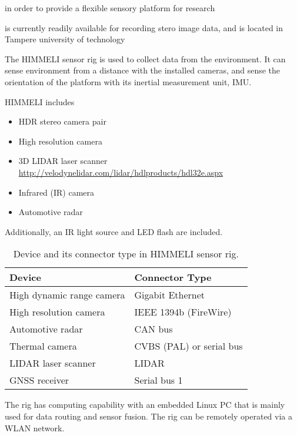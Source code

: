 \documentclass[12pt,a4paper,oneside,pdftex]{report}
\begin{document}
in order to provide a flexible sensory platform for research 

is currently readily available for recording stero image data, and is located in Tampere university of technology 



The HIMMELI sensor rig is used to collect data from the environment. It can sense environment from a distance with the installed cameras, and sense the orientation of the platform with its inertial measurement unit, IMU.

HIMMELI includes

\begin{itemize}
\setlength{\itemsep}{0pt}
\item HDR stereo camera pair
\item High resolution camera
\item 3D LIDAR laser scanner \url{http://velodynelidar.com/lidar/hdlproducts/hdl32e.aspx}
\item Infrared (IR) camera
\item Automotive radar
\end{itemize}

Additionally, an IR light source and LED flash are included.

\begin{table}
\caption{Device and its connector type in HIMMELI sensor rig.}
\label{table:connectortypes} %
\begin{tabular}{|p{6cm}|p{5cm}|}
\hline %
\textbf{Device} & \textbf{Connector Type} \\
\hline
High dynamic range camera & Gigabit Ethernet \\
\hline
High resolution camera & IEEE 1394b (FireWire) \\
\hline
Automotive radar & CAN bus \\
\hline
Thermal camera & CVBS (PAL) or serial bus \\
\hline
LIDAR laser scanner & LIDAR \\
\hline
GNSS receiver & Serial bus 1 \\ \hline
\end{tabular} %
\end{table} %

The rig has computing capability with an embedded Linux PC that is mainly used for data routing and sensor fusion. The rig can be remotely operated via a WLAN network.
\end{document}
